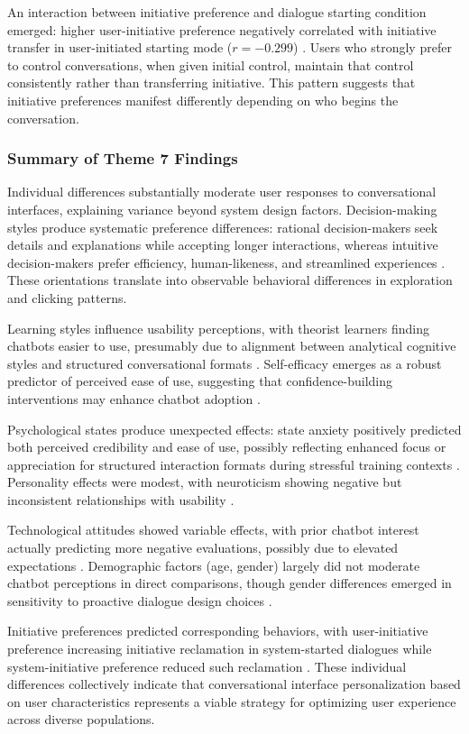 \documentclass[manuscript,anonymous,sigconf]{acmart}
\begin{document}
An interaction between initiative preference and dialogue starting condition emerged: higher user-initiative preference negatively correlated with initiative transfer in user-initiated starting mode ($r = -0.299$) \cite{A42}. Users who strongly prefer to control conversations, when given initial control, maintain that control consistently rather than transferring initiative. This pattern suggests that initiative preferences manifest differently depending on who begins the conversation.

\subsubsection{Summary of Theme 7 Findings}

Individual differences substantially moderate user responses to conversational interfaces, explaining variance beyond system design factors. Decision-making styles produce systematic preference differences: rational decision-makers seek details and explanations while accepting longer interactions, whereas intuitive decision-makers prefer efficiency, human-likeness, and streamlined experiences \cite{A42}. These orientations translate into observable behavioral differences in exploration and clicking patterns.

Learning styles influence usability perceptions, with theorist learners finding chatbots easier to use, presumably due to alignment between analytical cognitive styles and structured conversational formats \cite{A54}. Self-efficacy emerges as a robust predictor of perceived ease of use, suggesting that confidence-building interventions may enhance chatbot adoption \cite{A54}.

Psychological states produce unexpected effects: state anxiety positively predicted both perceived credibility and ease of use, possibly reflecting enhanced focus or appreciation for structured interaction formats during stressful training contexts \cite{A54}. Personality effects were modest, with neuroticism showing negative but inconsistent relationships with usability \cite{A54}.

Technological attitudes showed variable effects, with prior chatbot interest actually predicting more negative evaluations, possibly due to elevated expectations \cite{A13}. Demographic factors (age, gender) largely did not moderate chatbot perceptions in direct comparisons, though gender differences emerged in sensitivity to proactive dialogue design choices \cite{A16, A54}.

Initiative preferences predicted corresponding behaviors, with user-initiative preference increasing initiative reclamation in system-started dialogues while system-initiative preference reduced such reclamation \cite{A42}. These individual differences collectively indicate that conversational interface personalization based on user characteristics represents a viable strategy for optimizing user experience across diverse populations.
\end{document}

